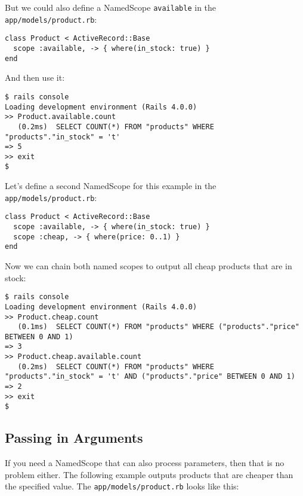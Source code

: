 \documentclass[a4paper]{book}
\begin{document}
But we could also define a NamedScope \texttt{available} in the \texttt{app/models/product.rb}:

\begin{shaded}\begin{verbatim}
class Product < ActiveRecord::Base
  scope :available, -> { where(in_stock: true) }
end
\end{verbatim}\end{shaded}

And then use it:

\begin{shaded}\begin{verbatim}
$ rails console
Loading development environment (Rails 4.0.0)
>> Product.available.count
   (0.2ms)  SELECT COUNT(*) FROM "products" WHERE "products"."in_stock" = 't'
=> 5
>> exit
$
\end{verbatim}\end{shaded}

Let's define a second NamedScope for this example in the \texttt{app/models/product.rb}:

\begin{shaded}\begin{verbatim}
class Product < ActiveRecord::Base
  scope :available, -> { where(in_stock: true) }
  scope :cheap, -> { where(price: 0..1) }
end
\end{verbatim}\end{shaded}

Now we can chain both named scopes to output all cheap products that are in stock:

\begin{shaded}\begin{verbatim}
$ rails console
Loading development environment (Rails 4.0.0)
>> Product.cheap.count
   (0.1ms)  SELECT COUNT(*) FROM "products" WHERE ("products"."price" BETWEEN 0 AND 1)
=> 3
>> Product.cheap.available.count
   (0.2ms)  SELECT COUNT(*) FROM "products" WHERE "products"."in_stock" = 't' AND ("products"."price" BETWEEN 0 AND 1)
=> 2
>> exit
$
\end{verbatim}\end{shaded}

\subsection{Passing in Arguments}\label{passing-in-arguments}

If you need a NamedScope that can also process parameters, then that is no problem either. The following example outputs products that are cheaper than the specified value. The \texttt{app/models/product.rb} looks like this:
\end{document}
